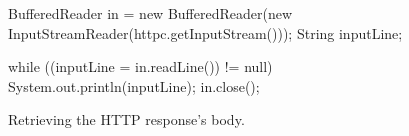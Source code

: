 \begin{figure*}[ht] %
\begin{center}
\begin{code}
BufferedReader in = 
  new BufferedReader(new InputStreamReader(httpc.getInputStream()));
String inputLine;

while ((inputLine = in.readLine()) != null) {
    System.out.println(inputLine);
}
in.close();
\end{code}
\caption{Retrieving the HTTP response's body.\label{clientimpl-body}}
\end{center}
\end{figure*}

